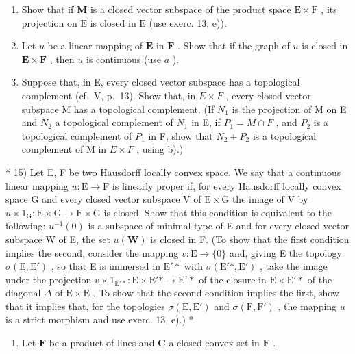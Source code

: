 \begin{enumerate}
\def\labelenumi{\alph{enumi})}
\item
  Show that if \(\mathbf{M}\) is a closed vector subspace of the product space \(\mathrm{E} \times \mathrm{F}\) , its projection on \(\mathrm{E}\) is closed in \(\mathrm{E}\) (use exerc. 13, e)).
\item
  Let \(u\) be a linear mapping of \(\mathbf{E}\) in \(\mathbf{F}\) . Show that if the graph of \(u\) is closed in \(\mathbf{E} \times \mathbf{F}\) , then \(u\) is continuous (use \(a\) ).
\item
  Suppose that, in E, every closed vector subspace has a topological complement (cf.~V, p.~13). Show that, in \(E \times F\) , every closed vector subspace M has a topological complement. (If \(N_{1}\) is the projection of M on E and \(N_{2}\) a topological complement of \(N_{1}\) in E, if \(P_{1} = M \cap F\) , and \(P_{2}\) is a topological complement of \(P_{1}\) in F, show that \(N_{2} + P_{2}\) is a topological complement of M in \(E \times F\) , using b).)
\end{enumerate}

* 15) Let E, F be two Hausdorff locally convex space. We say that a continuous linear mapping \(u: \mathrm{E} \to \mathrm{F}\) is linearly proper if, for every Hausdorff locally convex space G and every closed vector subspace V of \(\mathrm{E} \times \mathrm{G}\) the image of V by \(u \times 1_{\mathrm{G}}: \mathrm{E} \times \mathrm{G} \to \mathrm{F} \times \mathrm{G}\) is closed. Show that this condition is equivalent to the following: \(u^{-1}(0)\) is a subspace of minimal type of E and for every closed vector subspace W of E, the set \(u(\mathbf{W})\) is closed in F. (To show that the first condition implies the second, consider the mapping \(v: \mathrm{E} \to \{0\}\) and, giving E the topology \(\sigma(\mathrm{E}, \mathrm{E}')\) , so that E is immersed in \(\mathrm{E}'*\) with \(\sigma(\mathrm{E}'*, \mathrm{E}')\) , take the image under the projection \(v \times 1_{\mathrm{E}'*}: \mathrm{E} \times \mathrm{E}'* \to \mathrm{E}'*\) of the closure in \(\mathrm{E} \times \mathrm{E}'*\) of the diagonal \(\Delta\) of \(\mathrm{E} \times \mathrm{E}\) . To show that the second condition implies the first, show that it implies that, for the topologies \(\sigma(\mathrm{E}, \mathrm{E}')\) and \(\sigma(\mathrm{F}, \mathrm{F}')\) , the mapping \(u\) is a strict morphism and use exerc. 13, e).) *

\begin{enumerate}
\def\labelenumi{\arabic{enumi})}
\setcounter{enumi}{15}
\tightlist
\item
  Let \(\mathbf{F}\) be a product of lines and \(\mathbf{C}\) a closed convex set in \(\mathbf{F}\) .
\end{enumerate}

